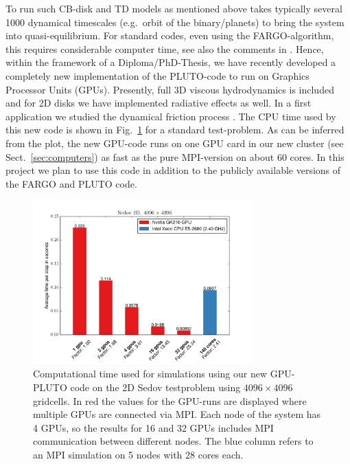 \documentclass[10pt,fleqn,twoside]{article}
\begin{document}
To run such CB-disk and TD models as mentioned above \citep{2013A&A...560A..40M}
takes typically several 1000 dynamical timescales (e.g.\ orbit of the binary/planets) to bring the system
into quasi-equilibrium. For standard codes, even using the FARGO-algorithm, this requires considerable
computer time, see also the comments in \citet{2011ApJ...729...47Z}. Hence, within the
framework of a Diploma/PhD-Thesis, we have recently
developed a completely new implementation of the PLUTO-code to run on Graphics Processor Units (GPUs).
Presently, full 3D viscous hydrodynamics is included and for 2D disks we have implemented
radiative effects as well. In a first application we studied the dynamical friction process
\citep{2016A&A...589A..10T} .
The CPU time used by this new code is shown in Fig.~\ref{fig:cpu} for a standard test-problem.
As can be inferred from the plot, the new GPU-code runs on one GPU card in our new cluster (see Sect.~\ref{sec:computers})
as fast as the pure MPI-version on about 60 cores.
In this project we plan to use this code in addition to the publicly available versions of the FARGO and PLUTO code.

\begin{figure}[t]
\centerline{\includegraphics[width=0.75\textwidth]{pics/sedov2d_scaling.pdf}}
\caption{\label{fig:cpu} Computational time used for simulations using our
  new GPU-PLUTO code on the 2D Sedov testproblem using $4096 \times 4096$
  gridcells.  In red the values for the GPU-runs are displayed where
  multiple GPUs are connected via MPI. Each node of the system has 4 GPUs,
  so the results for 16 and 32 GPUs includes MPI communication between
  different nodes. The blue column refers to an MPI simulation on 5 nodes
  with 28 cores each.}
\end{figure}
%
\end{document}
